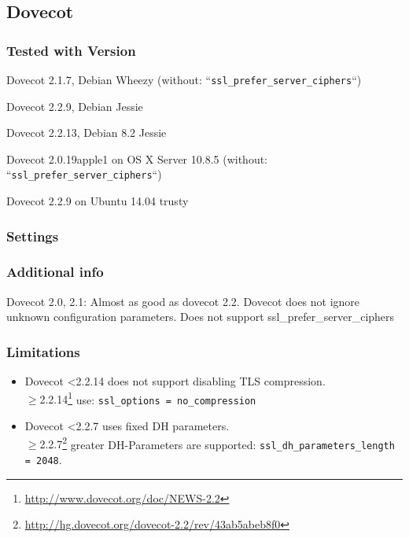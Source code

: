 \subsection{Dovecot}


\subsubsection{Tested with Version}
\begin{itemize*}
  \item Dovecot 2.1.7, Debian Wheezy (without: ``\texttt{ssl\_prefer\_server\_ciphers}``)
  \item Dovecot 2.2.9, Debian Jessie
  \item Dovecot 2.2.13, Debian 8.2 Jessie
  \item Dovecot 2.0.19apple1 on OS X Server 10.8.5 (without: ``\texttt{ssl\_prefer\_server\_ciphers}``)
  \item Dovecot 2.2.9 on Ubuntu 14.04 trusty
\end{itemize*}

\subsubsection{Settings}


\subsubsection{Additional info}
Dovecot 2.0, 2.1: Almost as good as dovecot 2.2. Dovecot does not ignore unknown configuration parameters. Does not support
ssl\_prefer\_server\_ciphers

\subsubsection{Limitations}
\begin{itemize}
	\item Dovecot <2.2.14 does not support disabling TLS compression.\\ 
		{\(\geq\)2.2.14}\footnote{\url{http://www.dovecot.org/doc/NEWS-2.2}} 
		use: \texttt{ssl\_options = no\_compression}
	\item Dovecot <2.2.7 uses fixed DH parameters.\\
		{\(\geq\)2.2.7}\footnote{\url{http://hg.dovecot.org/dovecot-2.2/rev/43ab5abeb8f0}} 
		greater DH-Parameters are supported: \texttt{ssl\_dh\_parameters\_length = 2048}. 
\end{itemize}

